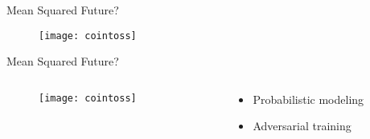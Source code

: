 \begin{frame}{Mean Squared Future?}

  \begin{figure}
    \texttt{[image: cointoss]}
  \end{figure}

\end{frame}


\begin{frame}{Mean Squared Future?}
  \begin{columns}
    \begin{column}{0.48\textwidth}
      \begin{figure}
        \texttt{[image: cointoss]}
      \end{figure}
    \end{column}
    \begin{column}{0.48\textwidth}
    \begin{itemize}
      \item Probabilistic modeling
      \item Adversarial training
    \end{itemize}
    \end{column}
  \end{columns}

\end{frame}
